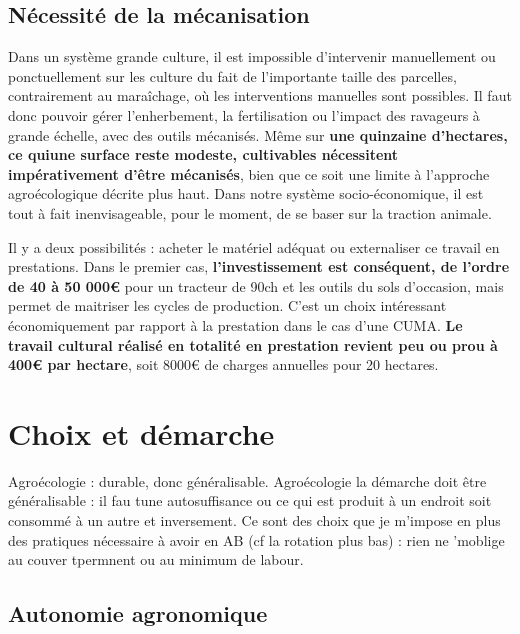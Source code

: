 \documentclass{book}
\begin{document}
\subsection{Nécessité de la mécanisation}

Dans un système grande culture, il est impossible d’intervenir manuellement ou ponctuellement sur les culture du fait de l’importante taille des parcelles, contrairement au maraîchage, où les interventions manuelles sont possibles. Il faut donc pouvoir gérer l’enherbement, la fertilisation ou l’impact des ravageurs à grande échelle, avec des outils mécanisés. Même sur \textbf{une quinzaine d'hectares, ce quiune surface reste modeste, cultivables nécessitent impérativement d'être mécanisés}, bien que ce soit une limite à l'approche agroécologique décrite plus haut. Dans notre système socio-économique, il est tout à fait inenvisageable, pour le moment, de se baser sur la traction animale. 

Il y a deux possibilités : acheter le matériel adéquat ou externaliser ce travail en prestations. Dans le premier cas, \textbf{l'investissement est conséquent, de l'ordre de 40 à 50 000\euro{}} pour un tracteur de 90ch et les outils du sols d'occasion, mais permet de maitriser les cycles de production. C'est un choix intéressant économiquement par rapport à la prestation dans le cas d'une CUMA. \textbf{Le travail cultural réalisé en totalité en prestation revient peu ou prou à 400\euro{} par hectare}, soit 8000\euro{} de charges annuelles pour 20 hectares.

\section{Choix et démarche}

Agroécologie : durable, donc généralisable.
Agroécologie la démarche doit être généralisable : il fau tune autosuffisance ou ce qui est produit à un endroit soit consommé à un autre et inversement.
Ce sont des choix que je m'impose en plus des pratiques nécessaire à avoir en AB (cf la rotation plus bas) : rien ne 'moblige au couver tpermnent ou au minimum de labour.

\subsection{Autonomie agronomique}
\end{document}
